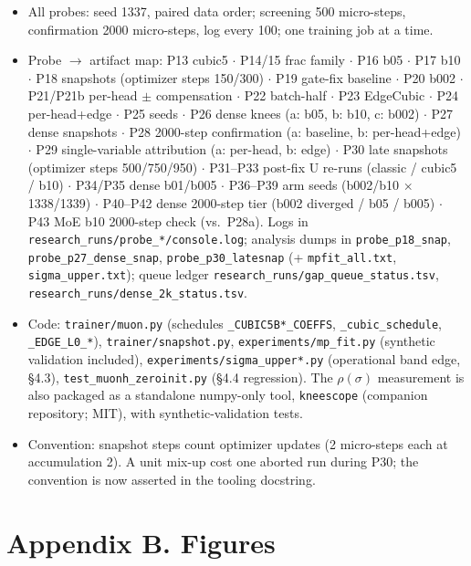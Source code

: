 \documentclass[
]{article}
\providecommand{\tightlist}{%
  \setlength{\itemsep}{0pt}\setlength{\parskip}{0pt}}
\begin{document}
\begin{itemize}
\tightlist
\item
  All probes: seed 1337, paired data order; screening 500 micro-steps,
  confirmation 2000 micro-steps, log every 100; one training job at a
  time.
\item
  Probe \(\to\) artifact map: P13 cubic5 \(\cdot\) P14/15 frac family
  \(\cdot\) P16 b05 \(\cdot\) P17 b10 \(\cdot\) P18 snapshots (optimizer
  steps 150/300) \(\cdot\) P19 gate-fix baseline \(\cdot\) P20 b002
  \(\cdot\) P21/P21b per-head \(\pm\) compensation \(\cdot\) P22
  batch-half \(\cdot\) P23 EdgeCubic \(\cdot\) P24 per-head+edge
  \(\cdot\) P25 seeds \(\cdot\) P26 dense knees (a: b05, b: b10, c:
  b002) \(\cdot\) P27 dense snapshots \(\cdot\) P28 2000-step
  confirmation (a: baseline, b: per-head+edge) \(\cdot\) P29
  single-variable attribution (a: per-head, b: edge) \(\cdot\) P30 late
  snapshots (optimizer steps 500/750/950) \(\cdot\) P31--P33 post-fix U
  re-runs (classic / cubic5 / b10) \(\cdot\) P34/P35 dense b01/b005
  \(\cdot\) P36--P39 arm seeds (b002/b10 \(\times\) 1338/1339) \(\cdot\)
  P40--P42 dense 2000-step tier (b002 diverged / b05 / b005) \(\cdot\)
  P43 MoE b10 2000-step check (vs.~P28a). Logs in
  \texttt{research\_runs/probe\_*/console.log}; analysis dumps in
  \texttt{probe\_p18\_snap}, \texttt{probe\_p27\_dense\_snap},
  \texttt{probe\_p30\_latesnap} (+ \texttt{mpfit\_all.txt},
  \texttt{sigma\_upper.txt}); queue ledger
  \texttt{research\_runs/gap\_queue\_status.tsv},
  \texttt{research\_runs/dense\_2k\_status.tsv}.
\item
  Code: \texttt{trainer/muon.py} (schedules \texttt{\_CUBIC5B*\_COEFFS},
  \texttt{\_cubic\_schedule}, \texttt{\_EDGE\_L0\_*}),
  \texttt{trainer/snapshot.py}, \texttt{experiments/mp\_fit.py}
  (synthetic validation included), \texttt{experiments/sigma\_upper*.py}
  (operational band edge, §4.3), \texttt{test\_muonh\_zeroinit.py} (§4.4
  regression). The \(\rho(\sigma)\) measurement is also packaged as a
  standalone numpy-only tool, \texttt{kneescope} (companion repository;
  MIT), with synthetic-validation tests.
\item
  Convention: snapshot steps count optimizer updates (2 micro-steps each
  at accumulation 2). A unit mix-up cost one aborted run during P30; the
  convention is now asserted in the tooling docstring.
\end{itemize}

\section{Appendix B. Figures}\label{appendix-b.-figures}
\end{document}

